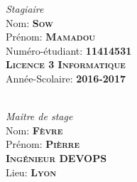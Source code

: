 \begin{titlepage}
\begin{center}
\begin{minipage}{0.4\textwidth}
\begin{flushleft} \large
\emph{Stagiaire}\\
Nom: \textbf{\textsc{Sow}}\\
 Prénom: \textbf{\textsc{Mamadou}}\\
Numéro-étudiant: \textbf{\textsc{11414531}}\\
\textbf{\textsc{Licence 3 Informatique}}\\
Année-Scolaire: \textbf{\textsc{2016-2017}}
\end{flushleft}
\end{minipage}
\begin{minipage}{0.4\textwidth}
\begin{flushright} \large
 \textbf{\textsc{}}\\
\emph{Maitre de stage} \\
Nom: \textbf{\textsc{Fèvre  }}\\
Prénom: \textbf{\textsc{Pièrre   }}\\
\textbf{\textsc{Ingénieur DEVOPS}}\\
Lieu:   \textbf{\textsc{Lyon    }}\\
\end{flushright}
\end{minipage}




\vfill


\end{center}
\end{titlepage}